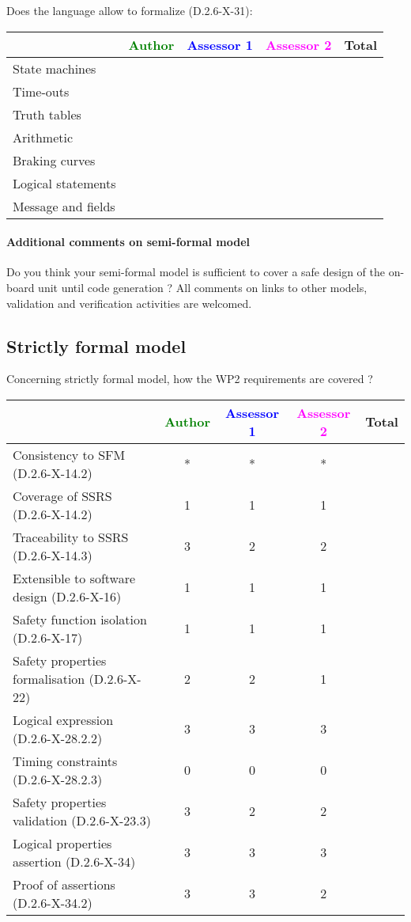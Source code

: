 Does the language allow to  formalize (D.2.6-X-31):

\begin{tabular}{|l | c | c | c | c|}
\hline
& \textcolor{green}{Author} & \textcolor{blue}{Assessor 1} & \textcolor{magenta}{Assessor 2} & Total \\
\hline 
State machines  & & & &  \\
\hline
Time-outs  & & & &  \\
\hline
Truth tables  & & & &  \\
\hline
Arithmetic  & & & &  \\
\hline
Braking curves  & & & &  \\
\hline
Logical statements & & & &  \\
\hline
Message and fields & & & &  \\
\hline
\end{tabular}

\paragraph{Additional comments on semi-formal  model} Do you think your semi-formal  model is sufficient to cover a safe design of the on-board unit until code generation ?
All comments on links to  other models, validation and verification activities are welcomed.

\subsection{Strictly formal model}

Concerning strictly formal model, how the WP2 requirements are covered ?

\begin{tabular}{|l | c | c | c | c|}
\hline
& \textcolor{green}{Author} & \textcolor{blue}{Assessor 1} & \textcolor{magenta}{Assessor 2} & Total \\
\hline 
Consistency to SFM (D.2.6-X-14.2) &* &* & *&  \\
\hline
Coverage of SSRS (D.2.6-X-14.2)  &1 &1 & 1&  \\
\hline
Traceability to  SSRS (D.2.6-X-14.3)  &3 &2 & 2&  \\
\hline
Extensible to software design (D.2.6-X-16)  &1 &1 & 1&  \\
\hline
Safety function isolation (D.2.6-X-17)  &1 &1 & 1&  \\
\hline 
Safety properties formalisation (D.2.6-X-22)  &2 &2 & 1&  \\
\hline
Logical expression (D.2.6-X-28.2.2)  &3 &3 & 3&  \\
\hline
Timing constraints (D.2.6-X-28.2.3)  &0 &0 & 0&  \\
\hline
Safety properties validation (D.2.6-X-23.3)  &3 &2 & 2&  \\
\hline
Logical properties assertion (D.2.6-X-34)  &3 &3 & 3&  \\
\hline
Proof of assertions (D.2.6-X-34.2)  &3 &3 & 2&  \\
\hline
\end{tabular}

